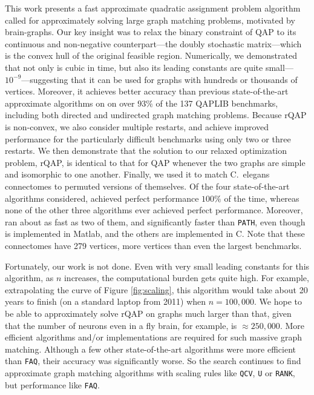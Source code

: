 \documentclass[11pt]{article}
\begin{document}
This work presents a fast approximate quadratic assignment problem algorithm called \FAQ for approximately solving large graph matching problems, motivated by brain-graphs.  Our key insight was to relax the binary constraint of QAP to its continuous and non-negative counterpart---the doubly stochastic matrix---which is the convex hull of the original feasible region.  
Numerically, we demonstrated that not only is \FAQ cubic in time, but also its leading constants are quite small---$10^{-9}$---suggesting that it can be used for graphs with hundreds or thousands of vertices.  
Moreover, it achieves better accuracy than previous state-of-the-art approximate algorithms on on over $93\%$ of the 137 QAPLIB benchmarks, including both directed and undirected graph matching problems.  Because rQAP is non-convex, we also consider multiple restarts, and achieve improved performance for the particularly difficult benchmarks using only two or three restarts.  We then demonstrate that the solution to our relaxed optimization problem, rQAP, is identical to that for QAP whenever the two graphs are simple and isomorphic to one another.  Finally, we used it to match C.~elegans connectomes to permuted versions of themselves. Of the four state-of-the-art algorithms considered, \FAQ achieved perfect performance $100\%$ of the time, whereas none of the other three algorithms ever achieved perfect performance.  Moreover, \FAQ ran about as fast as two of them, and significantly faster than \texttt{PATH}, even though \FAQ is implemented in Matlab, and the others are implemented in C.  Note that these connectomes have 279 vertices, more vertices than even the largest benchmarks. 


Fortunately, our work is not done. Even with very small leading constants for this algorithm, as $n$ increases, the computational burden gets quite high.  For example, extrapolating the curve of Figure \ref{fig:scaling}, this algorithm would take about 20 years to finish (on a standard laptop from 2011) when $n=100,000$.  We hope to be able to approximately solve rQAP on graphs much larger than that, given that the number of neurons even in a fly brain, for example, is $\approx 250,000$.  More efficient algorithms and/or implementations are required for such massive graph matching. Although a few other state-of-the-art algorithms were more efficient than \texttt{FAQ}, their accuracy was significantly worse.  So the search continues to find approximate graph matching algorithms with scaling rules like \texttt{QCV}, \texttt{U} or \texttt{RANK}, but performance like \texttt{FAQ}.
\end{document}
